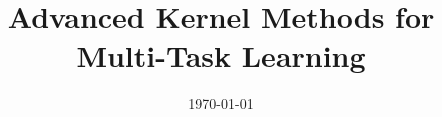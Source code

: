 \documentclass[a4paper, 11pt]{Thesis}  %
\begin{document}
\frontmatter	  %

\title  {Advanced Kernel Methods for Multi-Task Learning}
\addresses  {\groupname\\\deptname\\\univname}  
\date       {\today}
\subject    {}
\keywords   {}

\maketitle


\fancyhead{}  %
\rhead{\thepage}  %
\lhead{}  %

\pagestyle{fancy}  %




 
 
\end{document}
